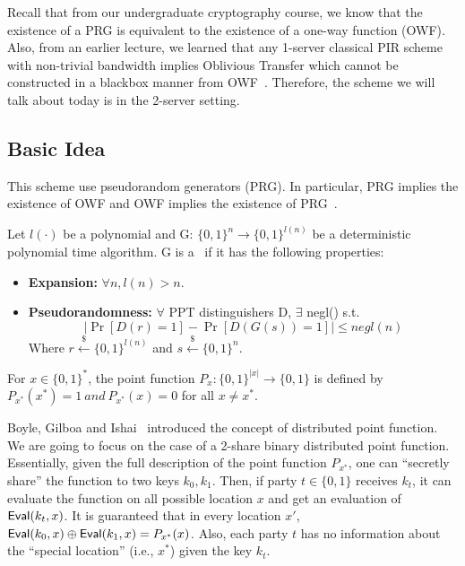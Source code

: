 Recall that 
from our undergraduate cryptography course, 
we know that the existence of a PRG
is equivalent to the existence of a one-way function (OWF).
Also, from an earlier lecture, we learned that any 1-server
classical PIR scheme 
with non-trivial bandwidth implies
Oblivious Transfer which cannot be constructed
in a blackbox manner from OWF~\cite{IR89}. 
Therefore, the scheme we will talk about today is in the 2-server setting.


\subsection{Basic Idea}
This scheme use pseudorandom generators (PRG). In particular, PRG implies the existence of OWF and OWF implies the existence of PRG~\cite{haastad1999pseudorandom}. 

\begin{definition}[PRG]
    Let $l(\cdot)$ be a polynomial and G: $ \{0,1\}^n \rightarrow \{0,1\}^{l(n)}$ be a deterministic
    polynomial time algorithm. G is a \Prg \ if it has the following properties:
    \hfill
    \begin{itemize}
        \item \textbf{Expansion:} $\forall n, l(n) > n$.
        \item \textbf{Pseudorandomness:} $\forall$ PPT distinguishers D, $\exists$ negl() s.t.
        $$\left|\Pr[D(r) = 1] - \Pr[D(G(s)) = 1]\right| \leq negl(n)$$ 
        Where $r \overset{{\scriptscriptstyle\$}}{\leftarrow} \{0,1\}^{l(n)}$ and
        $s \overset{{\scriptscriptstyle\$}}{\leftarrow} \{0,1\}^{n}$.
    \end{itemize}
\end{definition}


\begin{notation}
    For $x \in\{0,1\}^*$, the point function $P_{x}:\{0,1\}^{|{x}|} \rightarrow \{0,1\}$
    is defined by $P_{x^*}(x^*) = 1 \ and \ P_{x^*}(x) = 0$ for all $x \neq x^*$.
\end{notation}

Boyle, Gilboa and Ishai~\cite{boyle2016function} introduced the concept of distributed point function. 
We are going to focus on the case of a 2-share binary distributed point function. 
Essentially, given the full description of the point function $P_{x^*}$, one can ``secretly share'' the function to two keys $k_0,k_1$. Then, if party $t\in\{0,1\}$ receives $k_t$, it can evaluate the function on all possible location $x$ and get an evaluation of ${\sf Eval}(k_t, x)$. 
It is guaranteed that in every location $x'$, ${\sf Eval}(k_0, x)\oplus{\sf Eval}(k_1, x)=P_{x^*}(x)$.
Also, each party $t$ has no information about the ``special location'' (i.e., $x^*$) given the key $k_t$.


